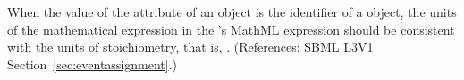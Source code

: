 When the value of the attribute  of an \EventAssignment
object is the identifier of a \SpeciesReference object, the units of the
mathematical expression in the \EventAssignment's MathML 
expression should be consistent with the units of stoichiometry, that is,
.  (References: SBML L3V1
Section~\ref{sec:eventassignment}.)

